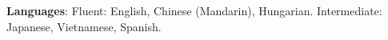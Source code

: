 









\textbf{Languages}: Fluent: English, Chinese (Mandarin), Hungarian. Intermediate: Japanese, Vietnamese, Spanish.\\ %

